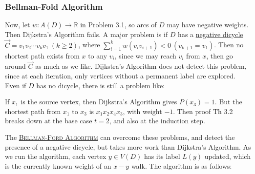 \subsubsection{Bellman-Fold Algorithm}
Now, let $w:A(D)\to \mathbb{R}$ in Problem 3.1, so arcs of $D$ may have negative weights. Then Dijkstra's Algorithm fails. A major problem is if $D$ has a \uline{negative dicycle} $\vec{C}=v_1 v_2\cdots v_k v_1\ (k\geqslant 2)$, where $\sum\limits_{i=1}^k w(v_i v_{i+1}) < 0\ (v_{k+1} = v_1)$. Then no shortest path exists from $x$ to any $v_i$, since we may reach $v_i$ from $x$, then go around $\vec{C}$ as much as we like. Dijkstra's Algorithm does not detect this problem, since at each iteration, only vertices without a permanent label are explored. Even if $D$ has no dicycle, there is still a problem like:



If $x_1$ is the source vertex, then Dijkstra's Algorithm gives $P(x_3) = 1$. But the shortest path from $x_1$ to $x_3$ is $x_1x_2x_4x_3$, with weight $-1$. Then proof Th 3.2 breaks down at the base case $t=2$, and also at the induction step.

The \uline{\textcolor{MarkerColour}{\textsc{Bellman-Ford Algorithm}}} can overcome these problems, and detect the presence of a negative dicycle, but takes more work than Dijkstra's Algorithm. As we run the algorithm, each vertex $y\in V(D)$ has its label $L(y)$ updated, which is the currently known weight of an $x-y$ walk. The algorithm is as follows:

